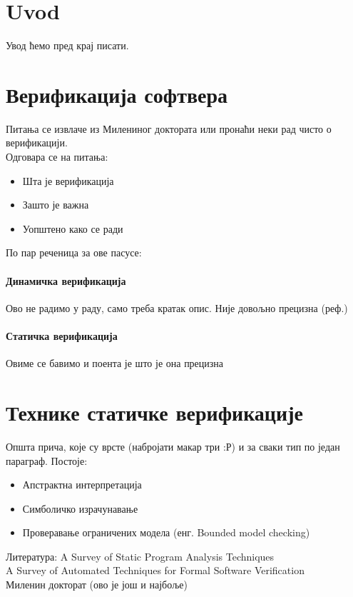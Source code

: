 \documentclass[a4paper]{article}
\begin{document}
{\tableofcontents

\newpage

\section{Uvod}
Увод ћемо пред крај писати.

\section{Верификација софтвера}

Питања се извлаче из Милениног доктората или пронаћи неки рад чисто о верификацији.\\
Одговара се на питања:
\begin{itemize}
\item Шта је верификација
\item Зашто је важна
\item Уопштено како се ради
\end{itemize}

По пар реченица за ове пасусе:
\paragraph{Динамичка верификација}
Ово не радимо у раду, само треба кратак опис. Није довољно прецизна (реф.)
\paragraph{Статичка верификација}
Овиме се бавимо и поента је што је она прецизна 


\section{Технике статичке верификације}
Општа прича, које су врсте (набројати макар три :Р) и за сваки тип по један параграф.
Постоје:
\begin{itemize}
\item Апстрактна интерпретација
\item Симболичко израчунавање
\item Проверавање ограничених модела (енг. Bounded model checking)
\end{itemize}
Литература:
A Survey of Static Program Analysis Techniques \cite{survey}\\
A Survey of Automated Techniques for Formal Software Verification \cite{dkw2008}\\
Миленин докторат (ово је још и најбоље)

}
\end{document}
